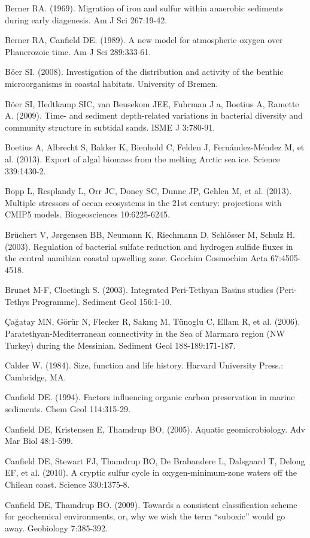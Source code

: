 Berner RA. (1969). Migration of iron and sulfur within anaerobic sediments during early diagenesis. Am J Sci 267:19-42.

Berner RA, Canfield DE. (1989). A new model for atmospheric oxygen over Phanerozoic time. Am J Sci 289:333-61.

B\"oer SI. (2008). Investigation of the distribution and activity of the benthic microorganisms in coastal habitats. University of Bremen.

B\"oer SI, Hedtkamp SIC, van Beusekom JEE, Fuhrman J a, Boetius A, Ramette A. (2009). Time- and sediment depth-related variations in bacterial diversity and community structure in subtidal sands. ISME J 3:780-91.

Boetius A, Albrecht S, Bakker K, Bienhold C, Felden J, Fernández-Méndez M, et al. (2013). Export of algal biomass from the melting Arctic sea ice. Science 339:1430-2.

Bopp L, Resplandy L, Orr JC, Doney SC, Dunne JP, Gehlen M, et al. (2013). Multiple stressors of ocean ecosystems in the 21st century: projections with CMIP5 models. Biogeosciences 10:6225-6245.

Br\"uchert V, J{\o}rgensen BB, Neumann K, Riechmann D, Schl\"osser M, Schulz H. (2003). Regulation of bacterial sulfate reduction and hydrogen sulfide fluxes in the central namibian coastal upwelling zone. Geochim Cosmochim Acta 67:4505-4518.

Brunet M-F, Cloetingh S. (2003). Integrated Peri-Tethyan Basins studies (Peri-Tethys Programme). Sediment Geol 156:1-10.

Çağatay MN, G\" or\" ur N, Flecker R, Sakınç M, T\" unoglu C, Ellam R, et al. (2006). Paratethyan-Mediterranean connectivity in the Sea of Marmara region (NW Turkey) during the Messinian. Sediment Geol 188-189:171-187.

Calder W. (1984). Size, function and life history. Harvard University Press.: Cambridge, MA.

Canfield DE. (1994). Factors influencing organic carbon preservation in marine sediments. Chem Geol 114:315-29.

Canfield DE, Kristensen E, Thamdrup BO. (2005). Aquatic geomicrobiology. Adv Mar Biol 48:1-599.

Canfield DE, Stewart FJ, Thamdrup BO, De Brabandere L, Dalsgaard T, Delong EF, et al. (2010). A cryptic sulfur cycle in oxygen-minimum-zone waters off the Chilean coast. Science 330:1375-8.

Canfield DE, Thamdrup BO. (2009). Towards a consistent classification scheme for geochemical environments, or, why we wish the term “suboxic” would go away. Geobiology 7:385-392.

